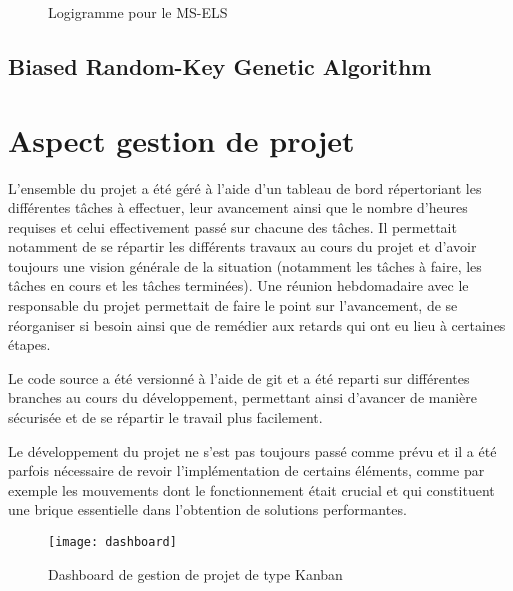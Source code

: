 			\begin{figure}[H]
				\centering
				\begin{tikzpicture}[node distance=1cm]
					
				\end{tikzpicture}
				\caption{Logigramme pour le MS-ELS}
				\label{fig:ms-els-logigram}
			\end{figure}

		\subsection{Biased Random-Key Genetic Algorithm}

	\section{Aspect gestion de projet}

		L'ensemble du projet a été géré à l'aide d'un tableau de bord répertoriant les différentes tâches à effectuer, leur avancement ainsi que le nombre d'heures requises et celui effectivement passé sur chacune des tâches. Il permettait notamment de se répartir les différents travaux au cours du projet et d'avoir toujours une vision générale de la situation (notamment les tâches à faire, les tâches en cours et les tâches terminées). Une réunion hebdomadaire avec le responsable du projet permettait de faire le point sur l'avancement, de se réorganiser si besoin ainsi que de remédier aux retards qui ont eu lieu à certaines étapes. 
		
		Le code source a été versionné à l'aide de git et a été reparti sur différentes branches au cours du développement, permettant ainsi d'avancer de manière sécurisée et de se répartir le travail plus facilement.
		
		Le développement du projet ne s'est pas toujours passé comme prévu et il a été parfois nécessaire de revoir l'implémentation de certains éléments, comme par exemple les mouvements dont le fonctionnement était crucial et qui constituent une brique essentielle dans l'obtention de solutions performantes.
		

		\begin{figure}[h!]
			\centering
			\texttt{[image: dashboard]}
			\caption{Dashboard de gestion de projet de type Kanban}
			\label{fig:dashboard}
		\end{figure}
